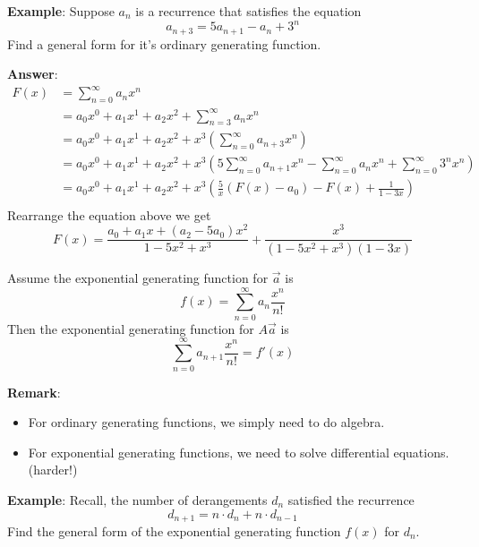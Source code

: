 \noindent \textbf{Example}: Suppose $a_n$ is a recurrence that satisfies the equation $$a_{n+3}=5a_{n+1}-a_n+3^n$$
Find a general form for it's ordinary generating function.

\noindent \textbf{Answer}:\\
\begin{equation}
    \begin{split}
        F(x) &= \sum_{n=0}^{\infty}a_nx^n\\
        &= a_0x^0+a_1x^1+a_2x^2+\sum_{n=3}^{\infty}a_nx^n\\
        &= a_0x^0+a_1x^1+a_2x^2+ x^3 (\sum_{n=0}^{\infty}a_{n+3}x^n)\\
        &= a_0x^0+a_1x^1+a_2x^2+ x^3 (5\sum_{n=0}^{\infty}a_{n+1}x^n -\sum_{n=0}^{\infty}a_{n}x^n +\sum_{n=0}^{\infty}3^nx^n)\\
        &= a_0x^0+a_1x^1+a_2x^2+ x^3 (\frac{5}{x}(F(x)-a_0) -F(x) + \frac{1}{1-3x})\\
    \end{split}
\end{equation}
Rearrange the equation above we get $$F(x)= \frac{a_0+a_1x+(a_2-5a_0)x^2}{1-5x^2+x^3} + \frac{x^3}{(1-5x^2+x^3)(1-3x)}$$

\begin{theorem}
    Assume the exponential generating function for $\vec{a}$ is $$f(x)=\sum_{n=0}^{\infty}a_n \frac{x^n}{n!}$$
    Then the exponential generating function for $A\vec{a}$ is $$\sum_{n=0}^{\infty}a_{n+1}\frac{x^n}{n!}=f'(x)$$
\end{theorem}

\noindent \textbf{Remark}:
\begin{itemize}
    \item For ordinary generating functions, we simply need to do algebra.
    \item For exponential generating functions, we need to solve differential equations. (harder!)
\end{itemize}

\noindent \textbf{Example}: Recall, the number of derangements $d_n$ satisfied the recurrence $$d_{n+1}=n \cdot d_n+n \cdot d_{n-1}$$
Find the general form of the exponential generating function $f(x)$ for $d_n$.

